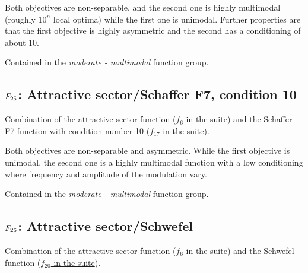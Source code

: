 Both objectives are non-separable, and the second one
is highly multimodal (roughly \(10^n\) local
optima) while the first one is unimodal. Further
properties are that the first objective is highly
asymmetric and the second has a conditioning of about 10.

Contained in the \emph{moderate - multimodal} function group.



\subsection[\texorpdfstring{\protect\(F_{25}\protect\): Attractive sector/Schaffer F7, condition 10}{F25: Attractive sector/Schaffer F7, condition 10}]{\texorpdfstring{\protect\(F_{25}\protect\): Attractive sector/Schaffer F7, condition 10}{}}
\label{index:attractive-sector-schaffer-f7-condition-10}\label{index:f25}
Combination of the attractive sector function (\href{https://coco.gforge.inria.fr/downloads/download16.00/bbobdocfunctions.pdf\#page=30}{\(f_6\) in the \bbob suite}) and the Schaffer F7 function with condition number 10
(\href{https://coco.gforge.inria.fr/downloads/download16.00/bbobdocfunctions.pdf\#page=85}{\(f_{17}\) in the \bbob suite}).

Both objectives are non-separable and asymmetric.
While the first objective is unimodal, the second one is
a highly multimodal function with a low conditioning where
frequency and amplitude of the modulation vary.

Contained in the \emph{moderate - multimodal} function group.



\subsection[\texorpdfstring{\protect\(F_{26}\protect\): Attractive sector/Schwefel}{F26: Attractive sector/Schwefel}]{\texorpdfstring{\protect\(F_{26}\protect\): Attractive sector/Schwefel}{}}
\label{index:f26}\label{index:attractive-sector-schwefel}
Combination of the attractive sector function (\href{https://coco.gforge.inria.fr/downloads/download16.00/bbobdocfunctions.pdf\#page=30}{\(f_6\) in the \bbob suite}) and the Schwefel function (\href{https://coco.gforge.inria.fr/downloads/download16.00/bbobdocfunctions.pdf\#page=100}{\(f_{20}\) in the \bbob suite}).


